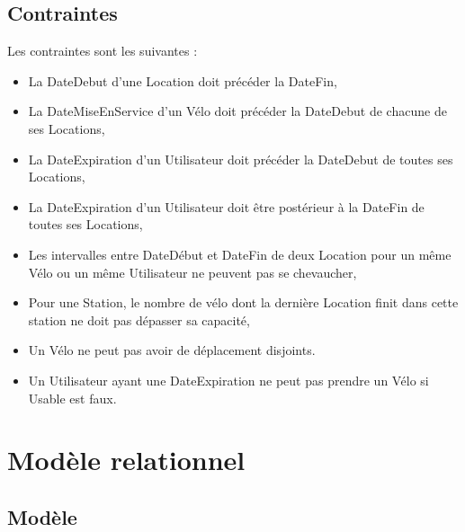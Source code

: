 \documentclass[a4paper,10pt]{article}
\begin{document}
\subsection{Contraintes}
Les contraintes sont les suivantes :
\begin{itemize}
  \item La DateDebut d'une Location doit précéder la DateFin, 
  \item La DateMiseEnService d'un Vélo doit précéder la DateDebut de chacune de ses Locations,
  \item La DateExpiration d'un Utilisateur doit précéder la DateDebut de toutes ses Locations,
  \item La DateExpiration d'un Utilisateur doit \^etre postérieur à la DateFin de toutes ses Locations,
  \item Les intervalles entre DateDébut et DateFin de deux Location pour un même Vélo ou un même Utilisateur ne peuvent pas se chevaucher,
  \item Pour une Station, le nombre de vélo dont la dernière Location finit  dans cette station ne doit pas dépasser sa capacité,
  \item Un Vélo ne peut pas avoir de déplacement disjoints.
  \item Un Utilisateur ayant une DateExpiration ne peut pas prendre un Vélo si Usable est faux.
\end{itemize}



\section{Modèle relationnel}
\subsection{Modèle}
\end{document}
